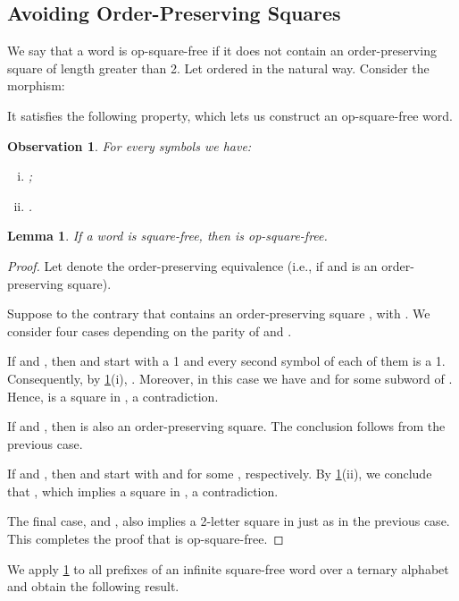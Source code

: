 \documentclass{article}
\theoremstyle{plain}
\newtheorem{lemma}[theorem]{Lemma}
\newtheorem{observation}[theorem]{Observation}
\theoremstyle{definition}
\theoremstyle{remark}
\begin{document}
\subsection{Avoiding Order-Preserving Squares}
  We say that a word is op-square-free if it does not contain an order-preserving square
  of length greater than 2.
  Let  ordered in the natural way. Consider the morphism:
    
  It satisfies the following property, which lets us construct an op-square-free word. 

    \begin{observation}\label{obs:simple}
      For every symbols  we have:
      \begin{enumerate}[(i)]
        \item ;
        \item .
      \end{enumerate}
    \end{observation}

  \begin{lemma}\label{lem:left}
    If a word  is square-free, then  is op-square-free.
  \end{lemma}

  \begin{proof}
    Let  denote the order-preserving equivalence
    (i.e.,  if  and  is an order-preserving square).

    \noindent
    Suppose to the contrary that  contains an order-preserving square
    , with .
    We consider four cases depending on the parity of  and .

    If  and , then  and  start with a 1 and every second symbol of each of them is a 1.
    Consequently, by \cref{obs:simple}(i), .
    Moreover, in this case we have  and  for some subword  of .
    Hence,  is a square in , a contradiction.

    If  and , then  is also an order-preserving square.
    The conclusion follows from the previous case.

    If  and , then  and  start with  and  for some
    , respectively.
    By \cref{obs:simple}(ii), we conclude that , which implies a square  in , a contradiction.

    The final case,  and , also implies a 2-letter square in 
    just as in the previous case.
    This completes the proof that  is op-square-free.
  \end{proof}

  \noindent
  We apply \cref{lem:left} to all prefixes of an infinite square-free word \cite{Thue} over a ternary alphabet
  and obtain the following result.
\end{document}
